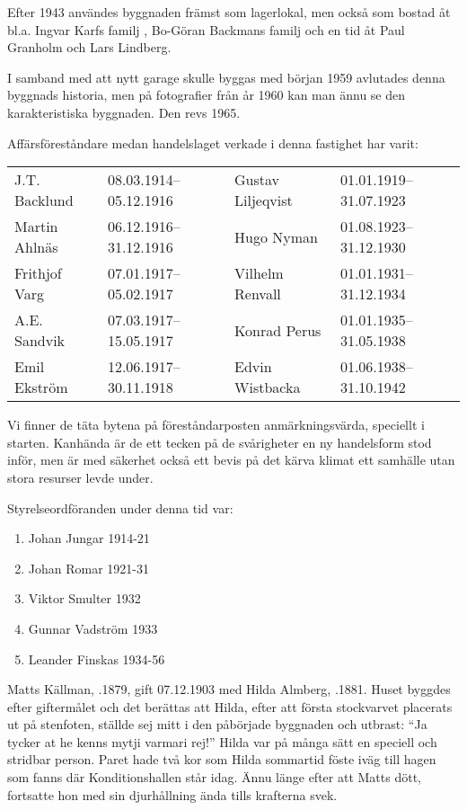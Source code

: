 Efter 1943 användes byggnaden främst som lagerlokal, men också  som bostad åt bl.a. Ingvar Karfs familj , Bo-Göran Backmans familj och en tid åt Paul Granholm och Lars Lindberg.

I samband med att nytt garage skulle byggas med början 1959 avlutades denna byggnads historia, men på fotografier från år 1960 kan man ännu se den karakteristiska byggnaden. Den revs 1965.

Affärsföreståndare medan handelslaget verkade i denna fastighet har varit:
\begin{center}
  \begin{tabular}{l l l l}
    \hline
    J.T. Backlund & 08.03.1914--05.12.1916 & Gustav Liljeqvist & 01.01.1919--31.07.1923 \\
    Martin Ahlnäs & 06.12.1916--31.12.1916 & Hugo Nyman & 01.08.1923--31.12.1930 \\
    Frithjof Varg & 07.01.1917--05.02.1917 & Vilhelm Renvall & 01.01.1931--31.12.1934 \\
    A.E. Sandvik & 07.03.1917--15.05.1917 & Konrad Perus & 01.01.1935--31.05.1938 \\
    Emil Ekström & 12.06.1917--30.11.1918 & Edvin Wistbacka & 01.06.1938--31.10.1942 \\ \hline
  \end{tabular}
\end{center}

Vi finner de täta bytena på föreståndarposten anmärkningsvärda, speciellt i starten. Kanhända är de ett tecken på de svårigheter en ny handelsform stod inför, men är med säkerhet också ett bevis på det kärva klimat ett samhälle utan stora resurser levde under.

Styrelseordföranden under denna tid var:
\begin{enumerate}
  \item Johan Jungar     1914-21
  \item Johan Romar      1921-31
  \item Viktor Smulter   1932
  \item Gunnar Vadström  1933
  \item Leander Finskas  1934-56
\end{enumerate}





Matts Källman, .1879, gift 07.12.1903 med Hilda Almberg, .1881. Huset byggdes efter giftermålet och det berättas att Hilda, efter att första stockvarvet placerats ut på stenfoten, ställde sej mitt i den påbörjade byggnaden och utbrast: ``Ja tycker at he kenns mytji varmari rej!'' Hilda var på många sätt en speciell och stridbar person. Paret hade två kor som Hilda sommartid föste iväg till hagen som fanns där Konditionshallen står idag. Ännu länge efter att Matts dött, fortsatte hon med sin djurhållning ända tills krafterna svek.

